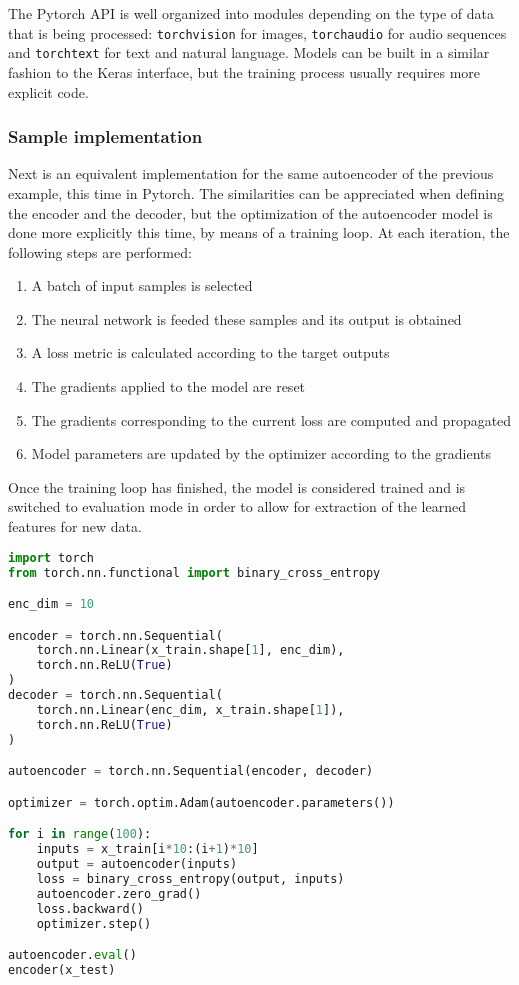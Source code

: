 The Pytorch API is well organized into modules depending on the type of data that is being processed: \texttt{torchvision} for images, \texttt{torchaudio} for audio sequences and \texttt{torchtext} for text and natural language. Models can be built in a similar fashion to the Keras interface, but the training process usually requires more explicit code.

\subsubsection{Sample implementation}

Next is an equivalent implementation for the same autoencoder of the previous example, this time in Pytorch. The similarities can be appreciated when defining the encoder and the decoder, but the optimization of the autoencoder model is done more explicitly this time, by means of a training loop. At each iteration, the following steps are performed:

\begin{enumerate}
    \item A batch of input samples is selected
    \item The neural network is feeded these samples and its output is obtained
    \item A loss metric is calculated according to the target outputs
    \item The gradients applied to the model are reset
    \item The gradients corresponding to the current loss are computed and propagated
    \item Model parameters are updated by the optimizer according to the gradients
\end{enumerate}

Once the training loop has finished, the model is considered trained and is switched to evaluation mode in order to allow for extraction of the learned features for new data.

\begin{lstlisting}[language=Python]
import torch
from torch.nn.functional import binary_cross_entropy

enc_dim = 10

encoder = torch.nn.Sequential(
    torch.nn.Linear(x_train.shape[1], enc_dim),
    torch.nn.ReLU(True)
)
decoder = torch.nn.Sequential(
    torch.nn.Linear(enc_dim, x_train.shape[1]),
    torch.nn.ReLU(True)
)

autoencoder = torch.nn.Sequential(encoder, decoder)

optimizer = torch.optim.Adam(autoencoder.parameters())

for i in range(100):
    inputs = x_train[i*10:(i+1)*10]
    output = autoencoder(inputs)
    loss = binary_cross_entropy(output, inputs)
    autoencoder.zero_grad()
    loss.backward()
    optimizer.step()

autoencoder.eval()
encoder(x_test)
\end{lstlisting}

